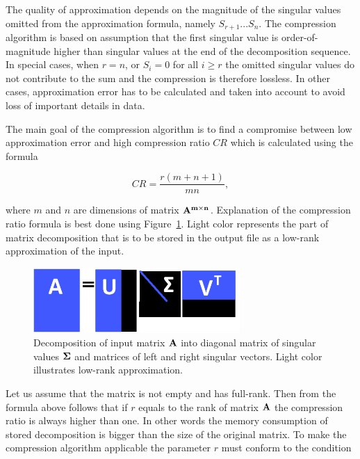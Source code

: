 The quality of approximation depends on the magnitude of the singular values omitted from the approximation formula, namely $S_{r+1} ...  S_{n}$. The compression algorithm is based on assumption that the first singular value is order-of-magnitude higher than singular values at the end of the decomposition sequence. In special cases, when $r=n$, or $S_{i}=0$ for all $i \geq r$ the omitted singular values do not contribute to the sum and the compression is therefore lossless. In other cases, approximation error has to be calculated and taken into account to avoid loss of important details in data.

The main goal of the compression algorithm is to find a compromise between low approximation error and high compression ratio $CR$ which is calculated using the formula

\begin{equation}
CR=\frac{r(m+n+1)}{m n},
\label{eq:cr-def}
\end{equation}

where $m$ and $n$ are dimensions of matrix $\mathbf{A^{m \times n}}$. Explanation of the compression ratio formula is best done using Figure~\ref{fig:lowrank_svd}. Light color represents the part of matrix decomposition that is to be stored in the output file as a low-rank approximation of the input.

\begin{figure}[H]
\centering\includegraphics[width=0.7\textwidth]{figures/low_rank_decomposition_diagram}
\caption{Decomposition of input matrix $\mathbf{A}$ into diagonal matrix of singular values $\mathbf{\Sigma}$ and matrices of left and right singular vectors. Light color illustrates low-rank approximation.}
\label{fig:lowrank_svd}
\end{figure}

Let us assume that the matrix is not empty and has full-rank. Then from the formula above follows that if $r$ equals to the rank of matrix $\mathbf{A}$ the compression ratio is always higher than one. In other words the memory consumption of stored decomposition is bigger than the size of the original matrix. To make the compression algorithm applicable the parameter $r$ must conform to the condition

